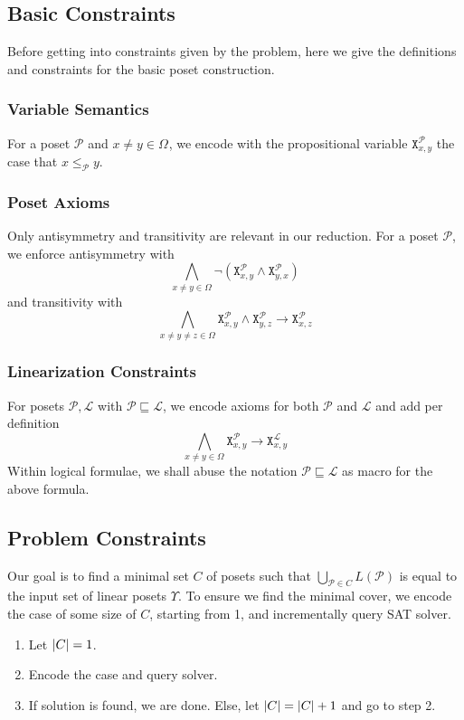 \documentclass[12pt]{llncs}
\DeclarePairedDelimiter{\abs}{\lvert}{\rvert}
\let\oldleq\leq
\renewcommand{\leq}[1][]{\oldleq_{#1}}
\renewcommand{\implies}{\rightarrow}
\newcommand{\poset}[1]{\mathcal{#1}}
\newcommand{\uni}[1][]{\Omega_{#1}}
\newcommand{\lang}[1]{L(#1)}
\newcommand{\lext}{\sqsubseteq}
\newcommand{\satvar}[2]{\mathtt{X}_{#1}^{#2}}
\begin{document}
\subsection{Basic Constraints}
Before getting into constraints given by the problem, here we give the definitions and constraints for the basic poset construction.

\subsubsection{Variable Semantics}
For a poset $\poset{P}$ and $x \!\neq\! y \!\in\! \uni$, we encode with the propositional variable $\satvar{x,y}{\poset{P}}$ the case that $x \leq[\poset{P}] y$.

\subsubsection{Poset Axioms}
Only antisymmetry and transitivity are relevant in our reduction. For a poset $\poset{P}$, we enforce antisymmetry with
\[
\bigwedge_{x \neq y \in \uni} \neg (\satvar{x,y}{\poset{P}} \wedge \satvar{y,x}{\poset{P}})
\]
and transitivity with
\[
\bigwedge_{x \neq y \neq z \in \uni}
\satvar{x,y}{\poset{P}} \wedge \satvar{y,z}{\poset{P}} \implies \satvar{x,z}{\poset{P}}
\]

\subsubsection{Linearization Constraints}
For posets $\poset{P},\poset{L}$ with $\poset{P} \lext \poset{L}$, we encode axioms for both $\poset{P}$ and $\poset{L}$ and add per definition
\[
\bigwedge_{x \neq y \in \uni} \satvar{x,y}{\poset{P}} \implies \satvar{x,y}{\poset{L}}
\]
Within logical formulae, we shall abuse the notation $\poset{P} \lext \poset{L}$ as macro for the above formula.

\subsection{Problem Constraints}
Our goal is to find a minimal set $C$ of posets such that $\bigcup_{\poset{P} \in C} \lang{\poset{P}}$ is equal to the input set of linear posets $\Upsilon$. To ensure we find the minimal cover, we encode the case of some size of $C$, starting from 1, and incrementally query SAT solver.

\begin{enumerate}
    \item Let $\abs{C} = 1$.
    \item Encode the case and query solver.
    \item If solution is found, we are done. Else, let $\abs{C} = \abs{C}+1$ and go to step 2.
\end{enumerate}
\end{document}
